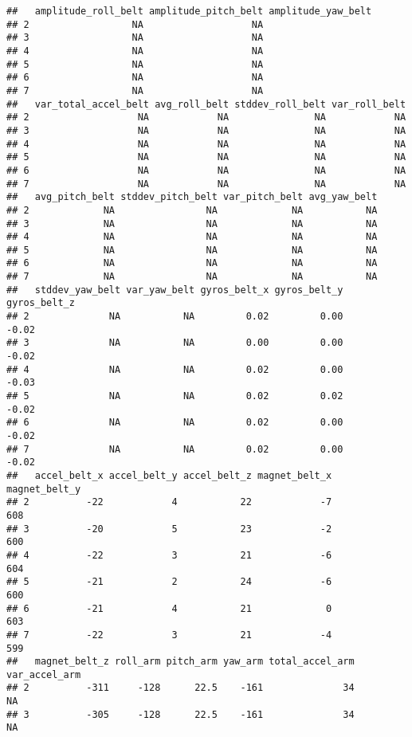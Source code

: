 \documentclass[]{article}
\begin{document}
\begin{verbatim}
##   amplitude_roll_belt amplitude_pitch_belt amplitude_yaw_belt
## 2                  NA                   NA                   
## 3                  NA                   NA                   
## 4                  NA                   NA                   
## 5                  NA                   NA                   
## 6                  NA                   NA                   
## 7                  NA                   NA                   
##   var_total_accel_belt avg_roll_belt stddev_roll_belt var_roll_belt
## 2                   NA            NA               NA            NA
## 3                   NA            NA               NA            NA
## 4                   NA            NA               NA            NA
## 5                   NA            NA               NA            NA
## 6                   NA            NA               NA            NA
## 7                   NA            NA               NA            NA
##   avg_pitch_belt stddev_pitch_belt var_pitch_belt avg_yaw_belt
## 2             NA                NA             NA           NA
## 3             NA                NA             NA           NA
## 4             NA                NA             NA           NA
## 5             NA                NA             NA           NA
## 6             NA                NA             NA           NA
## 7             NA                NA             NA           NA
##   stddev_yaw_belt var_yaw_belt gyros_belt_x gyros_belt_y gyros_belt_z
## 2              NA           NA         0.02         0.00        -0.02
## 3              NA           NA         0.00         0.00        -0.02
## 4              NA           NA         0.02         0.00        -0.03
## 5              NA           NA         0.02         0.02        -0.02
## 6              NA           NA         0.02         0.00        -0.02
## 7              NA           NA         0.02         0.00        -0.02
##   accel_belt_x accel_belt_y accel_belt_z magnet_belt_x magnet_belt_y
## 2          -22            4           22            -7           608
## 3          -20            5           23            -2           600
## 4          -22            3           21            -6           604
## 5          -21            2           24            -6           600
## 6          -21            4           21             0           603
## 7          -22            3           21            -4           599
##   magnet_belt_z roll_arm pitch_arm yaw_arm total_accel_arm var_accel_arm
## 2          -311     -128      22.5    -161              34            NA
## 3          -305     -128      22.5    -161              34            NA

\end{verbatim}
\end{document}
